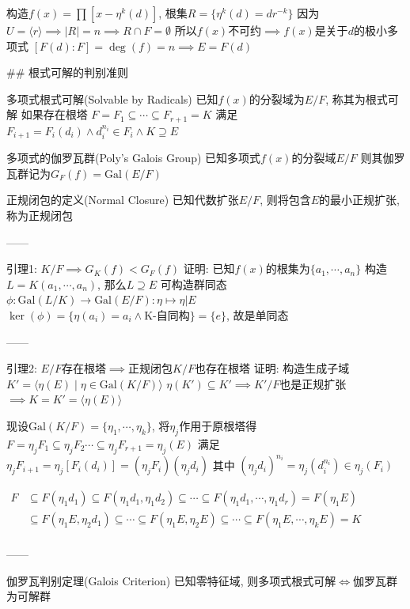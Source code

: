 构造$f(x)=\prod[x-\eta^k(d)]$, 根集$R=\{\eta^k(d)=dr^{-k}\}$
因为$U=\langle r\rangle\implies|R|=n\implies R\cap F=\emptyset$
所以$f(x)$不可约$\implies f(x)$是关于$d$的极小多项式
$[F(d):F]=\deg(f)=n\implies E=F(d)$


## 根式可解的判别准则

多项式根式可解(Solvable by Radicals)
已知$f(x)$的分裂域为$E/F$, 称其为根式可解
如果存在根塔 $F=F_1\subseteq\cdots\subseteq F_{r+1}=K$
满足 $F_{i+1}=F_i(d_i)\land d_i^{n_i}\in F_i\land K\supseteq E$

多项式的伽罗瓦群(Poly's Galois Group)
已知多项式$f(x)$的分裂域$E/F$
则其伽罗瓦群记为$G_F(f)=\text{Gal}(E/F)$

正规闭包的定义(Normal Closure)
已知代数扩张$E/F$, 则将包含$E$的最小正规扩张, 称为正规闭包

------

引理1: $K/F\implies G_K(f)<G_F(f)$
证明: 已知$f(x)$的根集为$\{a_1,\cdots,a_n\}$
构造$L=K(a_1,\cdots,a_n)$, 那么$L\supseteq E$
可构造群同态$\phi:\text{Gal}(L/K)\to\text{Gal}(E/F):\eta\mapsto\eta|E$
$\ker(\phi)=\{\eta(a_i)=a_i\land\text{K-自同构}\}=\{e\}$, 故是单同态

------

引理2: $E/F$存在根塔$\implies$正规闭包$K/F$也存在根塔
证明: 构造生成子域$K'=\langle\eta(E)\mid\eta\in\text{Gal}(K/F)\rangle$
$\eta(K')\subseteq K'\implies K'/F$也是正规扩张$\implies K=K'=\langle\eta(E)\rangle$

现设$\text{Gal}(K/F)=\{\eta_1,\cdots,\eta_k\}$, 将$\eta_j$作用于原根塔得
$F=\eta_jF_1\subseteq\eta_jF_2\cdots\subseteq\eta_jF_{r+1}=\eta_j(E)$
满足 $\eta_jF_{i+1}=\eta_j[F_i(d_i)]=(\eta_jF_i)(\eta_j d_i)$
其中 $(\eta_jd_i)^{n_i}=\eta_j(d_i^{n_i})\in\eta_j(F_i)$

$\begin{aligned}
    F&\subseteq F(\eta_1d_1)\subseteq F(\eta_1d_1,\eta_1d_2)\subseteq\cdots\subseteq F(\eta_1d_1,\cdots,\eta_1d_r)=F(\eta_1E) \\
     &\subseteq F(\eta_1E,\eta_2d_1)\subseteq\cdots\subseteq F(\eta_1E,\eta_2E)\subseteq\cdots\subseteq F(\eta_1E,\cdots,\eta_kE)=K \\
\end{aligned}$

------

伽罗瓦判别定理(Galois Criterion)
已知零特征域, 则多项式根式可解$\iff$伽罗瓦群为可解群
